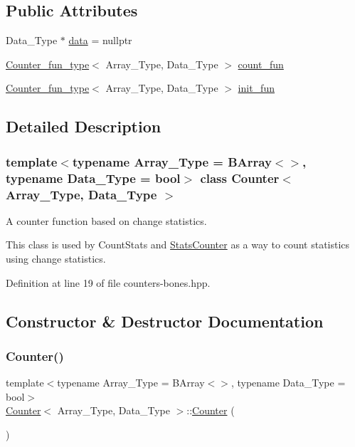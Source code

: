 \subsection*{Public Attributes}
\begin{DoxyCompactItemize}
\item 
Data\+\_\+\+Type $\ast$ \hyperlink{class_counter_a9ebfed99a67888f80c19cabc4098bdd0}{data} = nullptr
\item 
\hyperlink{typedefs_8hpp_ac0160f52f564dea3ac033b374cffbfe7}{Counter\+\_\+fun\+\_\+type}$<$ Array\+\_\+\+Type, Data\+\_\+\+Type $>$ \hyperlink{class_counter_a804d287379ef9b4204a0838edcce3b71}{count\+\_\+fun}
\item 
\hyperlink{typedefs_8hpp_ac0160f52f564dea3ac033b374cffbfe7}{Counter\+\_\+fun\+\_\+type}$<$ Array\+\_\+\+Type, Data\+\_\+\+Type $>$ \hyperlink{class_counter_abb4e0b67e6489d438918495651baa5a8}{init\+\_\+fun}
\end{DoxyCompactItemize}


\subsection{Detailed Description}
\subsubsection*{template$<$typename Array\+\_\+\+Type = B\+Array$<$$>$, typename Data\+\_\+\+Type = bool$>$\newline
class Counter$<$ Array\+\_\+\+Type, Data\+\_\+\+Type $>$}

A counter function based on change statistics. 

This class is used by {\ttfamily Count\+Stats} and {\ttfamily \hyperlink{class_stats_counter}{Stats\+Counter}} as a way to count statistics using change statistics. 

Definition at line 19 of file counters-\/bones.\+hpp.



\subsection{Constructor \& Destructor Documentation}
\mbox{\label{class_counter_a56c2f4ad875497dea97934cd3ddebc81}} 
\subsubsection{\texorpdfstring{Counter()}{Counter()}\hspace{0.1cm}{\footnotesize\ttfamily [1/3]}}
{\footnotesize\ttfamily template$<$typename Array\+\_\+\+Type = B\+Array$<$$>$, typename Data\+\_\+\+Type = bool$>$ \\
\hyperlink{class_counter}{Counter}$<$ Array\+\_\+\+Type, Data\+\_\+\+Type $>$\+::\hyperlink{class_counter}{Counter} (\begin{DoxyParamCaption}{ }\end{DoxyParamCaption})\hspace{0.3cm}{\ttfamily [inline]}}



